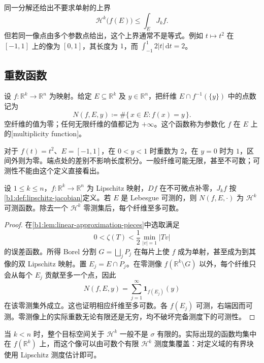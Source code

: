 同一分解还给出不要求单射的上界
\[
 \mathcal H^k\bigl(f(E)\bigr)\leq\int_EJ_kf.
\]
但若同一像点由多个参数点给出，这个上界通常不是等式。例如 \(t\mapsto t^2\) 在 \([-1,1]\) 上的像为 \([0,1]\)，其长度为 \(1\)，而 \(\int_{-1}^1 2|t|\,\mathrm dt=2\)。

\subsection{重数函数}
\label{b1:subsec:170302}

\begin{definition}\label{b1:def:multiplicity-function}
设 \(f:\mathbb R^k\to\mathbb R^n\) 为映射。给定 \(E\subseteq\mathbb R^k\) 及 \(y\in\mathbb R^n\)，把纤维 \(E\cap f^{-1}(\{y\})\) 中的点数记为
\[
 N(f,E,y)\coloneqq\#\{\,x\in E:f(x)=y\,\}.
\]
空纤维的值为零；任何无限纤维的值都记为 \(+\infty\)。这个函数称为参数化 \(f\) 在 \(E\) 上的[multiplicity function]。
\end{definition}

对于 \(f(t)=t^2\)、\(E=[-1,1]\)，在 \(0<y<1\) 时重数为 \(2\)，在 \(y=0\) 时为 \(1\)，区间外则为零。端点处的差别不影响长度积分。一般纤维可能无限，甚至不可数；可测性不能由这个定义直接看出。

\begin{proposition}\label{b1:prop:multiplicity-measurable}
设 \(1\le k\le n\)，\(f:\mathbb R^k\to\mathbb R^n\) 为 Lipschitz 映射，\(Df\) 在不可微点补零，\(J_kf\) 按\cref{b1:def:lipschitz-jacobian}定义。若 \(E\) 是 Lebesgue 可测的，则 \(N(f,E,\cdot)\) 为 \(\mathcal H^k\) 可测函数。除去一个 \(\mathcal H^k\) 零测集后，每个纤维至多可数。
\end{proposition}
\begin{proof}
在\cref{b1:lem:linear-approximation-pieces}中选取满足
\[
 0<\zeta(T)<\frac12\min_{|v|=1}|Tv|
\]
的误差函数。所得 Borel 分割 \(G=\bigsqcup_jP_j\) 在每片上使 \(f\) 成为单射，甚至成为到其像的双 Lipschitz 映射。置 \(E_j=E\cap P_j\)。在零测像 \(f(\mathbb R^k\setminus G)\) 以外，每个纤维只会从每个 \(E_j\) 贡献至多一个点，因此
\[
 N(f,E,y)=\sum_{j=1}^{\infty}\mathbf1_{f(E_j)}(y)
\]
在该零测集外成立。这也证明相应纤维至多可数。各 \(f(E_j)\) 可测，右端因而可测。零测像上的实际重数无论有限还是无穷，均不破坏完备测度下的可测性。
\end{proof}

当 \(k<n\) 时，整个目标空间关于 \(\mathcal H^k\) 一般不是 \(\sigma\) 有限的。实际出现的函数均集中在 \(f(\mathbb R^k)\) 上，而这个像可以由可数个有限 \(\mathcal H^k\) 测度集覆盖：对定义域的有界块使用 Lipschitz 测度估计即可。

